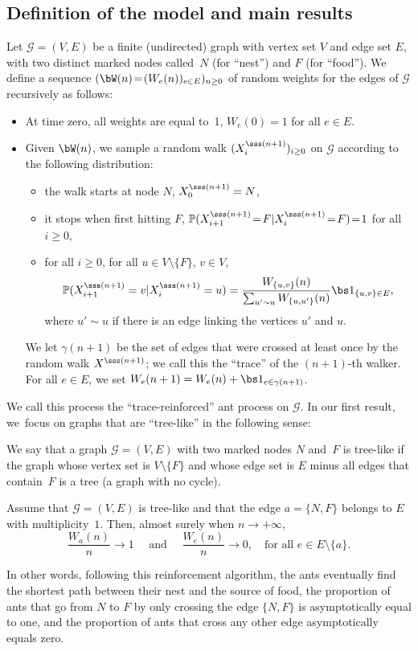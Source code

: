 \subsection{Definition of the model and main results}
Let $\mathcal G\!=\!(V,E)$ be a \hbox{finite} (undirected) graph with vertex set $V$ and edge set $E$,
with two distinct marked nodes called~$N$ (for ``nest'') and $F$ (for ``food'').
We define a sequence $(\bW(n)\!=\!(W_e(n))_{e\in E})_{n\geq 0}$ of random weights for the edges of $\mathcal G$ recursively as follows:
\begin{itemize}
\item At time zero, all weights are equal to~1, \ie $W_e(0) = 1$ for all $e\in E$.
\item Given $\bW(n)$, we sample a random walk $(X^{\sss (n+1)}_i)_{i\geq 0}$
on $\mathcal G$ according to the following distribution:
\begin{itemize}
\item the walk starts at node $N$, \ie $X_0^{\sss (n+1)} = N$,
\item it stops when first hitting $F$, \ie $\mathbb P(X^{\sss (n+1)}_{i+1}\!=\!F | X^{\sss (n+1)}_{i}\!=\!F)\!=\!1$ for all $i\!\geq\!0$,
\item for all $i\geq 0$, for all {$u\in V\setminus\{F\}$}, $v\in V$,
\[
\mathbb P(X^{\sss (n+1)}_{i+1} = v | X^{\sss (n+1)}_{i}=u) = \frac{W_{\{u,v\}}(n)}{\sum_{u'\sim u}W_{\{u,u'\}}(n)} \bs 1_{\{u,v\}\in E},
\]
where $u'\sim u$ if there is an edge linking the vertices $u'$ and $u$.
\end{itemize}
We let $\gamma(n+1)$ be the set of edges that were crossed at least once
by the random walk $X^{\sss (n+1)}$; we call this the ``trace'' of the $(n+1)$-th walker.
For all $e\in E$, we set $W_e(n+1) = W_e(n)+\bs 1_{e\in \gamma(n+1)}$.
\end{itemize}

We call this process the ``trace-reinforced'' ant process on $\mathcal G$. In our first result, we~focus on graphs that are ``tree-like'' in the following sense:

\begin{definition}
We say that a graph $\mathcal G = (V,E)$ with two marked nodes $N$ and~$F$
is tree-like if the graph whose vertex set is $V\setminus \{F\}$
and whose edge set is $E$ minus all edges that contain~$F$ is a tree (\ie a graph with no cycle).
\end{definition}

\begin{theorem}\label{th:main}
Assume that $\mathcal G = (V,E)$ is tree-like and that the edge $a=\{N,F\}$ belongs to $E$ with multiplicity~$1$.
Then, almost surely when $n\to+\infty$,
\[
\frac{W_a(n)}{n} \to 1
\quad\text{ and }\quad
\frac{W_e(n)}{n} \to 0,\quad \text{for all } e\in E\setminus\{a\}.
\]
\end{theorem}
In other words, following this reinforcement algorithm, the ants eventually find the shortest path between their nest and the source of food, \ie the proportion of ants that go from $N$ to $F$ by only crossing the edge $\{N,F\}$ is asymptotically equal to one, and the proportion of ants that cross any other edge asymptotically equals zero.

